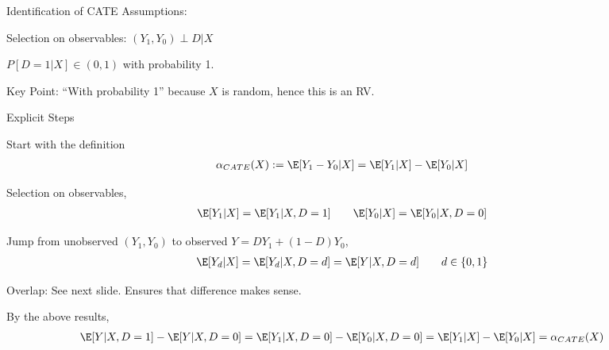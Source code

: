 \documentclass[aspectratio=169, handout]{beamer}
\begin{document}
{\scriptsize
\begin{frame}{Identification of CATE}
Assumptions:
\vspace{-7pt}
\begin{enumerate}
  {\footnotesize
  \item Selection on observables: $(Y_1,Y_0)\perp D | X$
  \item $P[D=1|X]\in (0,1)$ with probability 1.

    \alert{Key Point}:
    ``With probability 1'' because $X$ is random, hence this is an RV.
  }
\end{enumerate}
\vspace{-7pt}
Explicit Steps
\vspace{-7pt}
\begin{itemize}
  {\footnotesize
  \pause
  \item
    Start with the definition
    \begin{align*}
      \alpha_{CATE}(X)
      &:=
      \E[Y_1-Y_0|X]
      =
      \E[Y_1|X]
      -
      \E[Y_0|X]
    \end{align*}
\vspace{-7pt}
  \pause
\vspace{-7pt}
  \item
    Selection on observables,
    \begin{align*}
      \E[Y_1|X]
      &=
      \E[Y_1|X,D=1]
      \qquad
      \E[Y_0|X]
      =
      \E[Y_0|X,D=0]
    \end{align*}
  \pause
\vspace{-7pt}
  \item Jump from \alert{unobserved} $(Y_1,Y_0)$ to \alert{observed}
    $Y=DY_1 + (1-D)Y_0$,
    \begin{align*}
      \E[Y_d|X]
      &=
      \E[Y_d|X,D=d]
      =
      \E[Y|X,D=d]
      \qquad
      d\in\{0,1\}
    \end{align*}
\vspace{-7pt}
  \pause
\vspace{-7pt}
  \item Overlap: See next slide.
    Ensures that difference makes sense.
  \pause
  \item By the above results,
    \begin{align*}
      \E[Y|X,D=1]
      -
      \E[Y|X,D=0]
      &=
      \E[Y_1|X,D=0]
      -
      \E[Y_0|X,D=0]
      =
      \E[Y_1|X]
      -
      \E[Y_0|X]
      =
      \alpha_{CATE}(X)
    \end{align*}
  }
\end{itemize}
\end{frame}
}
\end{document}
